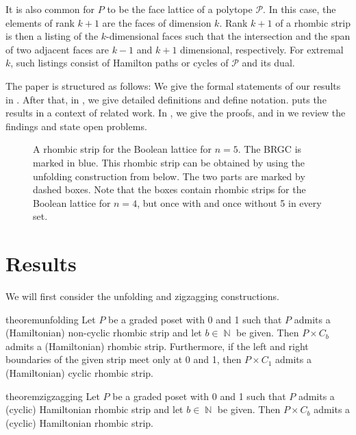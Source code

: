 \documentclass[fontsize=11pt,a4paper,DIV=12]{scrartcl}
\DeclareMathOperator{\N}{\mathbb{N}}
\begin{document}
It is also common for $P$ to be the face lattice of a polytope $\mathcal P$. In this case, the elements of rank $k+1$ are the faces of dimension $k$. Rank $k+1$ of a rhombic strip is then a listing of the $k$-dimensional faces such that the intersection and the span of two adjacent faces are $k-1$ and $k+1$ dimensional, respectively. For extremal $k$, such listings consist of Hamilton paths or cycles of $\mathcal P$ and its dual.

The paper is structured as follows: We give the formal statements of our results in . After that, in , we give detailed definitions and define notation.  puts the results in a context of related work. In , we give the proofs, and in  we review the findings and state open problems.

\begin{figure}
	\centering
	
	\caption{A rhombic strip for the Boolean lattice for $n=5$. The BRGC is marked in blue. This rhombic strip can be obtained by using the unfolding construction from below. The two parts are marked by dashed boxes. Note that the boxes contain rhombic strips for the Boolean lattice for $n=4$, but once with and once without 5 in every set.}
	\label{fig:boolean with brgc}
\end{figure}

\section{Results}\label{sec:results}

We will first consider the unfolding and zigzagging constructions.

\begin{restatable}[Unfolding]{theorem}{unfolding}\label{thm:unfolding}
	Let $P$ be a graded poset with 0 and 1 such that $P$ admits a (Hamiltonian) non-cyclic rhombic strip and let $b\in\N$ be given. Then $P\times C_b$ admits a (Hamiltonian) rhombic strip. Furthermore, if the left and right boundaries of the given strip meet only at 0 and 1, then $P\times C_{1}$ admits a (Hamiltonian) cyclic rhombic strip.
\end{restatable}

\begin{restatable}[Zigzagging]{theorem}{zigzagging}\label{thm:zigzagging}
	Let $P$ be a graded poset with 0 and 1 such that $P$ admits a (cyclic) Hamiltonian rhombic strip and let $b\in\N$ be given. Then $P\times C_b$ admits a (cyclic) Hamiltonian rhombic strip.
\end{restatable}
\end{document}

